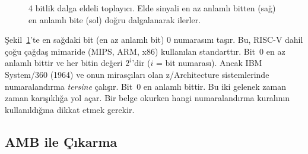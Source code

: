 \begin{figure}[htbp]
\centering
{}
\caption[4 bitlik dalga eldeli toplay{\i}c{\i}]{4 bitlik dalga eldeli toplay{\i}c{\i}. Elde sinyali en az anlaml{\i} bitten (sa\u{g}) en anlaml{\i} bite (sol) do\u{g}ru dalgalanarak ilerler.}
\label{fig:4bit-toplayici}
\end{figure}

\FloatBarrier
\begin{bilginot}
Şekil~\ref{fig:4bit-toplayici}'te en sağdaki bit (en az anlamlı bit) 0 numarasını taşır. Bu, RISC-V dahil çoğu çağdaş mimaride (MIPS, ARM, x86) kullanılan standarttır. Bit~0 en az anlamlı bittir ve her bitin değeri $2^i$'dir ($i$ = bit numarası). Ancak IBM System/360 (1964) ve onun mirasçıları olan z/Architecture sistemlerinde numaralandırma \emph{tersine} çalışır. Bit~0 en anlamlı bittir. Bu iki gelenek zaman zaman karışıklığa yol açar. Bir belge okurken hangi numaralandırma kuralının kullanıldığına dikkat etmek gerekir.
\end{bilginot}

\subsection{AMB ile Çıkarma}
\label{sec:amb-ile-cikarma}

